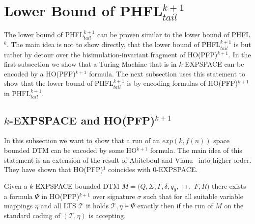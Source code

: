 
\section{Lower Bound of PHFL$^{k + 1}_{tail}$}\label{sec:lowerBoundOfPhflTail}

The lower bound of PHFL$^{k+1}_{tail}$ can be proven similar to the lower bound of PHFL$^k$. The main idea is not to
show directly, that the lower bound of PHFL$^{k+1}_{tail}$ is  but rather by detour over the
bisimulation-invariant fragment of HO(PFP)$^{k+1}$. In the first subsection we show that a Turing Machine that is in
$k$-EXPSPACE can be encoded by a HO(PFP)$^{k+1}$ formula. The next subsection uses this statement to show that the
lower bound of PHFL$^{k+1}_{tail}$ is  by encoding formulas of HO(PFP)$^{k+1}$ in PHFL$^{k+1}_{tail}$.

\subsection{$k$-EXPSPACE and HO(PFP)$^{k+1}$}\label{subsec:kExpspaceInHopfp}

In this subsection we want to show that a run of an $exp(k, f(n))$ space bounded DTM can be encoded by some
HO$^{k+1}$ formula. The main idea of this statement is an extension of the result of Abiteboul and
Vianu~\cite{abiteboul1995computing} into higher-order. They have shown that HO(PFP)$^1$ coincides with $0$-EXPSPACE.


\begin{lemma}
    \label{lemma:expspace_in_ho_pfp}
    Given a $k$-EXPSPACE-bounded DTM $M = (Q, \Sigma, \Gamma, \delta, q_0, \Box,$ $ F, R)$ there exists a formula $\Psi$ in HO(PFP)$^{k+1}$ over signature $\sigma$ such that for all suitable variable mappings $\eta$ and all LTS $\mathcal{T}$ it holds $\mathcal{T}, \eta \models \Psi$ exactly then if the run of $M$ on the standard coding of $(\mathcal{T}, \eta)$ is accepting.
\end{lemma}


